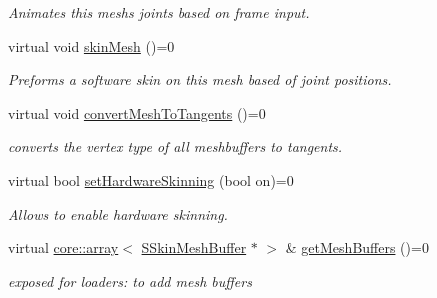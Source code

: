 \begin{DoxyCompactItemize}
\begin{DoxyCompactList}\small\item\em Animates this mesh\textquotesingle{}s joints based on frame input. \end{DoxyCompactList}\item 
\mbox{\label{classirr_1_1scene_1_1ISkinnedMesh_a3bd5dd1429c13bce259557875a5bbe7d}} 
virtual void \hyperlink{classirr_1_1scene_1_1ISkinnedMesh_a3bd5dd1429c13bce259557875a5bbe7d}{skin\+Mesh} ()=0
\begin{DoxyCompactList}\small\item\em Preforms a software skin on this mesh based of joint positions. \end{DoxyCompactList}\item 
virtual void \hyperlink{classirr_1_1scene_1_1ISkinnedMesh_ae63f3f1a74bf38c4b5113e3a5b96c0f3}{convert\+Mesh\+To\+Tangents} ()=0
\begin{DoxyCompactList}\small\item\em converts the vertex type of all meshbuffers to tangents. \end{DoxyCompactList}\item 
\mbox{\label{classirr_1_1scene_1_1ISkinnedMesh_a42ff192210ffc61a4c9fe8184b466b17}} 
virtual bool \hyperlink{classirr_1_1scene_1_1ISkinnedMesh_a42ff192210ffc61a4c9fe8184b466b17}{set\+Hardware\+Skinning} (bool on)=0
\begin{DoxyCompactList}\small\item\em Allows to enable hardware skinning. \end{DoxyCompactList}\item 
\mbox{\label{classirr_1_1scene_1_1ISkinnedMesh_a5c46b784d6e8b7479e6f630377ab42ef}} 
virtual \hyperlink{classirr_1_1core_1_1array}{core\+::array}$<$ \hyperlink{structirr_1_1scene_1_1SSkinMeshBuffer}{S\+Skin\+Mesh\+Buffer} $\ast$ $>$ \& \hyperlink{classirr_1_1scene_1_1ISkinnedMesh_a5c46b784d6e8b7479e6f630377ab42ef}{get\+Mesh\+Buffers} ()=0
\begin{DoxyCompactList}\small\item\em exposed for loaders\+: to add mesh buffers \end{DoxyCompactList}\item 
\mbox{\label{classirr_1_1scene_1_1ISkinnedMesh_a4fcdc38666f24a092191668ff909936f}} 

\end{DoxyCompactItemize}
